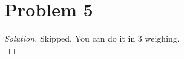 \section*{Problem 5}
	\begin{proof} [Solution]
		Skipped. You can do it in 3 weighing.\\
	\end{proof}